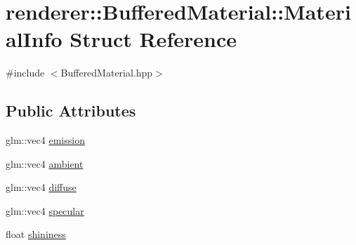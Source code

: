 \hypertarget{structrenderer_1_1BufferedMaterial_1_1MaterialInfo}{\section{renderer\-:\-:Buffered\-Material\-:\-:Material\-Info Struct Reference}
\label{structrenderer_1_1BufferedMaterial_1_1MaterialInfo}
}


{\ttfamily \#include $<$Buffered\-Material.\-hpp$>$}

\subsection*{Public Attributes}
\begin{DoxyCompactItemize}
\item 
glm\-::vec4 \hyperlink{structrenderer_1_1BufferedMaterial_1_1MaterialInfo_a27350baf307eb4a508b0e726fc0e1558}{emission}
\item 
glm\-::vec4 \hyperlink{structrenderer_1_1BufferedMaterial_1_1MaterialInfo_a2e4808bce6b30981c285f563bfcbfa36}{ambient}
\item 
glm\-::vec4 \hyperlink{structrenderer_1_1BufferedMaterial_1_1MaterialInfo_aec57af05914500a1edf7c86cc50b7f74}{diffuse}
\item 
glm\-::vec4 \hyperlink{structrenderer_1_1BufferedMaterial_1_1MaterialInfo_a2d764c23541048f55a4cba7e8615ee1f}{specular}
\item 
float \hyperlink{structrenderer_1_1BufferedMaterial_1_1MaterialInfo_a7a65e7a13eee4961ac97083902b77d0a}{shininess}
\end{DoxyCompactItemize}


